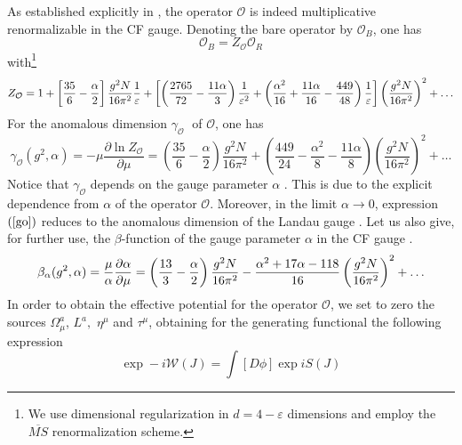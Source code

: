\documentclass[a4paper,12pt]{article}
\begin{document}
As established explicitly in \cite{kmsi,Gracey:2002yt}, the operator $%
\mathcal{O}$ is indeed multiplicative renormalizable in the CF gauge.
Denoting the bare operator by $\mathcal{O}_{B}$, one has
\begin{equation}
\mathcal{O}_{B}=Z_{\mathcal{O}}\mathcal{O}_{R}  \label{mr}
\end{equation}
with\footnote{%
We use dimensional regularization in $d=4-\varepsilon$ dimensions and employ
the $\overline{MS}$ renormalization scheme.} \cite{kmsi,Gracey:2002yt}
\begin{equation}
Z_{\mathcal{O}}=1+\left[ \frac{35}{6}-\frac{\alpha }{2}\right]\frac{g ^{2}N}{%
16\pi ^{2}}\frac{1}{\varepsilon }+\left[\left(\frac{2765}{72}-\frac{11\alpha%
}{3}\right)\frac{1}{\varepsilon^{2}} +\left(\frac{\alpha^{2}}{16}+\frac{%
11\alpha}{16}-\frac{449}{48}\right)\frac{1}{\varepsilon}\right]\left(\frac{%
g^{2}N}{16\pi^{2}}\right)^{2}+\ldots  \label{zo}
\end{equation}
For the anomalous dimension $\gamma _{\mathcal{O}}\;$ of $\mathcal{O}$, one
has \cite{kmsi,Gracey:2002yt}
\begin{equation}
\gamma _{\mathcal{O}}(g^{2},\alpha)=-\mu \frac{\partial \ln Z_{\mathcal{O}}
}{\partial {\mu }}=\left( \frac{35}{6}-\frac{\alpha }{2}\right) \frac{g^{2}N%
}{16\pi ^{2}}+\left(\frac{449}{24}-\frac{\alpha^{2}}{8}-\frac{11\alpha}{8}%
\right)\left(\frac{g^{2}N}{16\pi ^{2}}\right)^{2}+\ldots  \label{go}
\end{equation}
Notice that $\gamma _{\mathcal{O}}$ depends on the gauge parameter $\alpha $%
. This is due to the explicit dependence from $\alpha $ of the operator $%
\mathcal{O}$. Moreover, in the limit $\alpha \rightarrow 0$, expression $%
\left( \ref{go}\right) $ reduces to the anomalous dimension of the Landau
gauge \cite{v1}. Let us also give, for further use, the $\beta $-function of
the gauge parameter $\alpha $ in the CF gauge \cite{kmsi,Gracey:2002yt}.
\begin{equation}
\beta _{\alpha }(g^{2},\alpha)=\frac{\mu}{\alpha}\frac{\partial\alpha}{%
\partial\mu}= \left( \frac{13}{3}-\frac{\alpha }{2}\right) \frac{g^{2}N}{%
16\pi ^{2}}-\frac{\alpha^{2}+17\alpha-118}{16}\left(\frac{g^{2}N}{16\pi ^{2}}%
\right)^2+\ldots  \label{ba}
\end{equation}
In order to obtain the effective potential for the operator $\mathcal{O}$,
we set to zero the sources $\Omega _{\mu }^{a}$, $L^{a},$ $\eta ^{\mu }$ and
$\tau ^{\mu }$, obtaining for the generating functional the following
expression
\begin{equation}
\exp -i\mathcal{W}(J)=\int [D\phi ]\exp iS(J)  \label{wj}
\end{equation}
\end{document}
